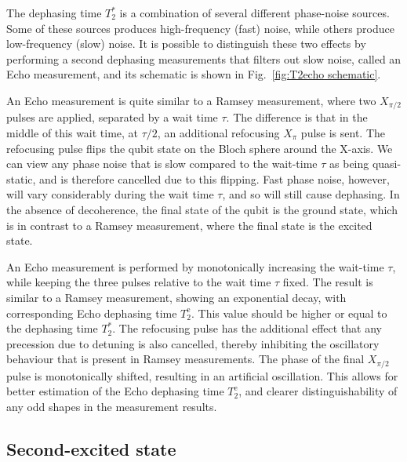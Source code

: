           The dephasing time $T_2^*$ is a combination of several different phase-noise sources. Some of these sources produces high-frequency (fast) noise, while others produce low-frequency (slow) noise. It is possible to distinguish these two effects by performing a second dephasing measurements that filters out slow noise, called an Echo measurement, and its schematic is shown in Fig.~\ref{fig:T2echo schematic}.

          An Echo measurement is quite similar to a Ramsey measurement, where two $X_{\pi/2}$ pulses are applied, separated by a wait time $\tau$. The difference is that in the middle of this wait time, at $\tau/2$, an additional refocusing $X_{\pi}$ pulse is sent. The refocusing pulse flips the qubit state on the Bloch sphere around the X-axis. We can view any phase noise that is slow compared to the wait-time $\tau$ as being quasi-static, and is therefore cancelled due to this flipping. Fast phase noise, however, will vary considerably during the wait time $\tau$, and so will still cause dephasing. In the absence of decoherence, the final state of the qubit is the ground state, which is in contrast to a Ramsey measurement, where the final state is the excited state.

          An Echo measurement is performed by monotonically increasing the wait-time $\tau$, while keeping the three pulses relative to the wait time $\tau$ fixed. The result is similar to a Ramsey measurement, showing an exponential decay, with corresponding Echo dephasing time $T_2^\text{e}$. This value should be higher or equal to the dephasing time $T_2^*$. The refocusing pulse has the additional effect that any precession due to detuning is also cancelled, thereby inhibiting the oscillatory behaviour that is present in Ramsey measurements. The phase of the final $X_{\pi/2}$ pulse is monotonically shifted, resulting in an artificial oscillation. This allows for better estimation of the Echo dephasing time $T_2^\text{e}$, and clearer distinguishability of any odd shapes in the measurement results.

      \subsection{Second-excited state}
        \label{ssec:Second-excited state}


